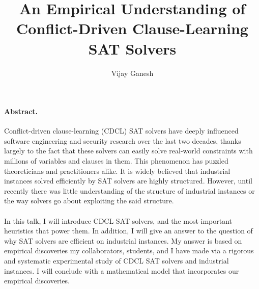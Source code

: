 \documentclass[EPiCempty]{easychair}
\begin{document}
\title{An Empirical Understanding of Conflict-Driven Clause-Learning SAT Solvers}
\author{Vijay Ganesh}


\maketitle
\paragraph{Abstract.}
Conflict-driven clause-learning (CDCL) SAT solvers have deeply influenced
software engineering and security research over the last two decades, thanks
largely to the fact that these solvers can easily solve real-world constraints
with millions of variables and clauses in them. This phenomenon has puzzled
theoreticians and practitioners alike. It is widely believed that industrial
instances solved efficiently by SAT solvers are highly structured. However,
until recently there was little understanding of the structure of industrial
instances or the way solvers go about exploiting the said structure.
\\\\
In this talk, I will introduce CDCL SAT solvers, and the most important
heuristics that power them. In addition, I will give an answer to the question
of why SAT solvers are efficient on industrial instances. My answer is based on
empirical discoveries my collaborators, students, and I have made via a
rigorous and systematic experimental study of CDCL SAT solvers and industrial
instances. I will conclude with a mathematical model that incorporates our
empirical discoveries.
\end{document}
